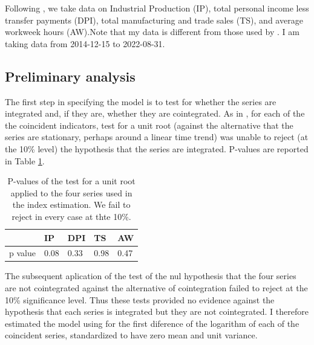	Following , we take data on Industrial Production (IP), total personal income less transfer payments (DPI), total manufacturing and trade sales (TS), and average workweek hours (AW).Note that my data is different from those used by . I am taking data from 2014-12-15 to 2022-08-31.

	\subsection{Preliminary analysis}
	
	The first step in specifying the model is to test for whether the series are integrated and, if they are, whether they are cointegrated.  As in , for each of the the coincident indicators,  test for a unit root (against the alternative that the series are stationary, perhaps around a linear time trend) was unable to reject (at the 10\% level) the hypothesis that the series are integrated. P-values are reported in Table \ref{tab:df_pvalues}.
	
	\begin{table}[h!]
		\centering\small
		\captionsetup{width=0.6\textwidth, font=small}
		\caption{P-values of the test \protect{} for a unit root applied to the four series used in the index estimation. We fail to reject in every case at thte 10\%.}\label{tab:df_pvalues}
		\vspace{0cm}
		\begin{tabular}{l|llll}
			& IP & DPI & TS & AW \\\hline\hline
			p value & 0.08 & 0.33 & 0.98 & 0.47 \\\hline
		\end{tabular}
	\end{table}
 
	The subsequent aplication of the  test of the nul hypothesis that the four series are not cointegrated against the alternative of cointegration failed to reject at the 10\% significance level. Thus these tests provided no evidence against the hypothesis that each series is integrated but they are not cointegrated. I therefore estimated the model using for the first diference of the logarithm of each of the coincident series, standardized to have zero mean and unit variance.

